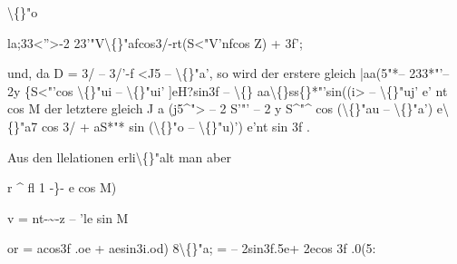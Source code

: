 \documentclass[10pt,a4paper]{article}
\begin{document}
\textbackslash\{\}"o

la;33<''>-2 23'"V\textbackslash\{\}"afcos3/-rt(S<"V'nfcos Z) + 3f';

und, da D = 3/ -- 3/'-f <J5 -- \textbackslash\{\}"a', so wird
der erstere gleich |aa(5"*-- 233*"'-- 2y \{S<"'cos \textbackslash\{\}"ui -- \textbackslash\{\}"ui' ]eH?sin3f
-- \textbackslash\{\} aa\textbackslash\{\}ss\{\}*"'sin((i> -- \textbackslash\{\}"uj' e' nt cos M
der letztere gleich J a (j5\textasciicircum{}"> -- 2 S'"' -- 2 y S\textasciicircum{}"\textasciicircum{} cos (\textbackslash\{\}"au -- \textbackslash\{\}"a') e\textbackslash\{\}"a7 cos 3/
+ aS*"* sin (\textbackslash\{\}"o -- \textbackslash\{\}"u)') e'nt sin 3f .

Aus den llelationen
erli\textbackslash\{\}"alt man aber

r \textasciicircum{} fl 1 -\}- e cos M)

v = nt-\textasciitilde{}-z -- 'le sin M

or = acos3f .oe + aesin3i.od)
8\textbackslash\{\}"a; = -- 2sin3f.5e+ 2ecos 3f .0(5:

\newpage
\end{document}
